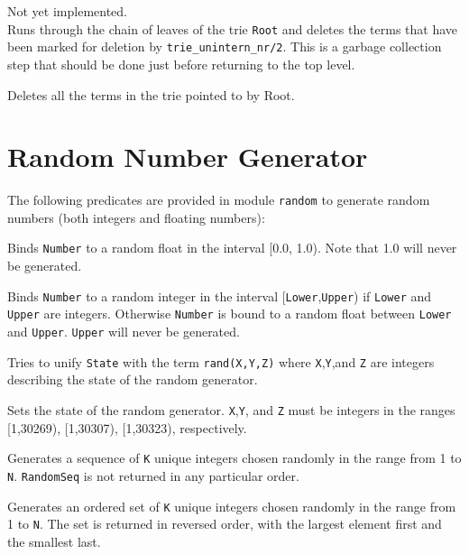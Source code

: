 \begin{description}
Not yet implemented.\\
Runs through the chain of leaves of the trie {\tt Root} and
deletes the terms that have been marked for deletion by
{\tt trie\_unintern\_nr/2}. This is a garbage collection step that should
be done just before returning to the top level.

 
Deletes all the terms in the trie pointed to by Root.


\end{description}



\section{Random Number Generator}

The following predicates are provided in module \texttt{random} to
generate random numbers (both integers and floating numbers):

\begin{description}

 
%
Binds \texttt{Number} to a random float in the interval [0.0, 1.0).
Note that 1.0 will never be generated.

 
    Binds \texttt{Number} to a random integer in the interval
    [\texttt{Lower},\texttt{Upper}) if \texttt{Lower} and \texttt{Upper}
    are integers.  Otherwise \texttt{Number} is bound to a random float
    between \texttt{Lower} and \texttt{Upper}.  \texttt{Upper} will
    never be generated.

 
    Tries to unify \texttt{State} with the term \texttt{rand(X,Y,Z)}
    where \texttt{X},\texttt{Y},and \texttt{Z} are integers describing
    the state of the random generator.

 
    Sets the state of the random generator.  \texttt{X},\texttt{Y}, and
    \texttt{Z} must be integers in the ranges [1,30269), [1,30307),
    [1,30323), respectively.

 
    Generates a sequence of \texttt{K} unique integers chosen randomly
    in the range from 1 to \texttt{N}.  \texttt{RandomSeq} is not
    returned in any particular order.

 
    Generates an ordered set of \texttt{K} unique integers chosen
    randomly in the range from 1 to \texttt{N}.  The set is returned in
    reversed order, with the largest element first and the smallest
    last.

\end{description}

